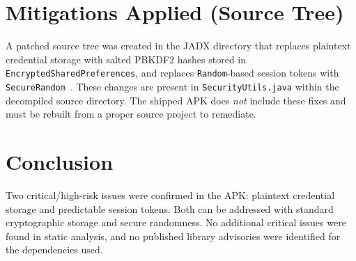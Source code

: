 \documentclass[letterpaper,twocolumn,10pt]{article}
\begin{document}
\section{Mitigations Applied (Source Tree)}
A patched source tree was created in the JADX directory that replaces plaintext credential storage with salted PBKDF2 hashes stored in \texttt{EncryptedSharedPreferences}, and replaces \texttt{Random}-based session tokens with \texttt{SecureRandom}~\cite{encprefs,masterkey,securedoc}. These changes are present in \texttt{SecurityUtils.java} within the decompiled source directory. The shipped APK does \emph{not} include these fixes and must be rebuilt from a proper source project to remediate.

\section{Conclusion}
Two critical/high-risk issues were confirmed in the APK: plaintext credential storage and predictable session tokens. Both can be addressed with standard cryptographic storage and secure randomness. No additional critical issues were found in static analysis, and no published library advisories were identified for the dependencies used.
\end{document}
